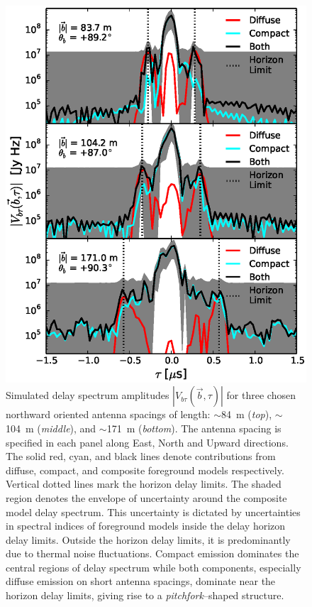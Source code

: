 \documentclass[preprint2,iop,numberedappendix]{emulateapj}
\begin{document}
\begin{figure}[htb]
\centering
\includegraphics[width=\linewidth]{figures/v1_0/delta_array_3_baseline_comparison_CLEAN_noiseless_visibilities_0.3m_ground_custom_gaussian_FG_model_all_sky_nside_64_Tsys_95.0K_185.0_MHz_30.7_MHz_bhw2.0.eps}
\caption{Simulated delay spectrum amplitudes $|V_{b\tau}(\vec{b},\tau)|$ for three chosen northward oriented antenna spacings of length: $\sim$84~m ({\it top}), $\sim$104~m ({\it middle}), and $\sim$171~m ({\it bottom}). The antenna spacing is specified in each panel along East, North and Upward directions. The solid red, cyan, and black lines denote contributions from diffuse, compact, and composite foreground models respectively. Vertical dotted lines mark the horizon delay limits. The shaded region denotes the envelope of uncertainty around the composite model delay spectrum. This uncertainty is dictated by uncertainties in spectral indices of foreground models inside the delay horizon delay limits. Outside the horizon delay limits, it is predominantly due to thermal noise fluctuations. Compact emission dominates the central regions of delay spectrum while both components, especially diffuse emission on short antenna spacings, dominate near the horizon delay limits, giving rise to a {\it pitchfork}--shaped structure. \label{fig:pitchfork-baselines}}
\end{figure}
\end{document}
